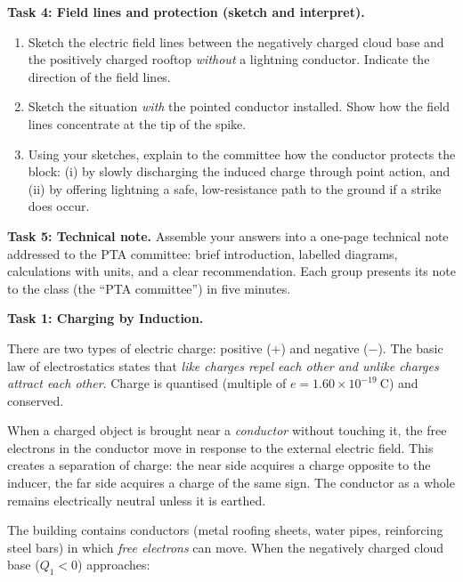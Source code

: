 \documentclass[11pt]{article}
\newcommand{\cle}[1]{{\popxbold\color{popdark}#1}}
\newcounter{popsec}
\newcounter{popsub}
\newcommand{\courssub}[1]{%
  \stepcounter{popsub}%
  \par\vspace{9pt}\noindent{\popxbold\fontsize{11.5}{13}\selectfont\color{popink}{\color{poporange}\thepopsec.\thepopsub}\hspace{6pt}#1}\par\nopagebreak\vspace{4pt}
}
\begin{document}
\textbf{Task 4: Field lines and protection (sketch and interpret).}
\begin{enumerate}
\item Sketch the electric field lines between the negatively charged cloud base and the positively charged rooftop \emph{without} a lightning conductor. Indicate the direction of the field lines.
\item Sketch the situation \emph{with} the pointed conductor installed. Show how the field lines concentrate at the tip of the spike.
\item Using your sketches, explain to the committee how the conductor protects the block: (i) by slowly discharging the induced charge through point action, and (ii) by offering lightning a safe, low-resistance path to the ground if a strike does occur.
\end{enumerate}

\textbf{Task 5: Technical note.} Assemble your answers into a one-page technical note addressed to the PTA committee: brief introduction, labelled diagrams, calculations with units, and a clear recommendation. Each group presents its note to the class (the ``PTA committee'') in five minutes.

\courssub{Model Answer}

\textbf{Task 1: Charging by Induction.}

\begin{definition}
There are two types of electric charge: \cle{positive} ($+$) and \cle{negative} ($-$). The \cle{basic law of electrostatics} states that \emph{like charges repel each other and unlike charges attract each other}. Charge is quantised (multiple of $e = 1.60\times 10^{-19}\ \mathrm{C}$) and conserved.
\end{definition}

\begin{propriete}
When a charged object is brought near a \emph{conductor} without touching it, the free electrons in the conductor move in response to the external electric field. This creates a separation of charge: the near side acquires a charge opposite to the inducer, the far side acquires a charge of the same sign. The conductor as a whole remains electrically neutral unless it is earthed.
\end{propriete}

The building contains conductors (metal roofing sheets, water pipes, reinforcing steel bars) in which \emph{free electrons} can move. When the negatively charged cloud base ($Q_1 < 0$) approaches:
\end{document}
